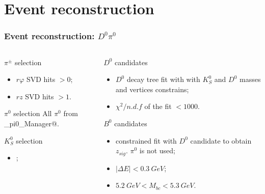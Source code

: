 \documentclass[10 pt,compress,mathserif]{beamer}
\begin{document}
\section{Event reconstruction}
\begin{frame}[containsverbatim]
 \frametitle{Event reconstruction: $D^0\pi^0$}
 \begin{columns}
  \begin{column}{0.5\textwidth}
   \begin{block}{$\pi^{\pm}$ selection}
  \begin{itemize}
   \item $r\varphi$ SVD hits $>0$;
   \item $rz$ SVD hits $>1$.
  \end{itemize}
 \end{block}
 \begin{block}{$\pi^0$ selection}
  All $\pi^0$ from \verb@Mdst_pi0_Manager@.
 \end{block}
 \begin{block}{$K_S^0$ selection}
 \begin{itemize}
  \item \verb@nisKsFinder@;
 \end{itemize}
 \end{block}
  \end{column}
  \begin{column}{0.5\textwidth}
   \begin{block}{$D^0$ candidates}
    \begin{itemize}
     \item $D^0$ decay tree fit with \verb@ExKFitter@ with $K_S^0$ and $D^0$ masses and vertices constrains;
     \item $\chi^2/n.d.f$ of the fit $<1000$.
    \end{itemize}
   \end{block}
   \begin{block}{$B^0$ candidates}
    \begin{itemize}
     \item \verb@IPTube@ constrained fit with $D^0$ candidate to obtain $z_{sig}$. $\pi^0$ is not used;
     \item $\left|\Delta E\right| < 0.3\ GeV$;
     \item $5.2\ GeV < M_{bc} < 5.3\ GeV$.
    \end{itemize}
   \end{block}
  \end{column}
 \end{columns}
\end{frame}
\end{document}
